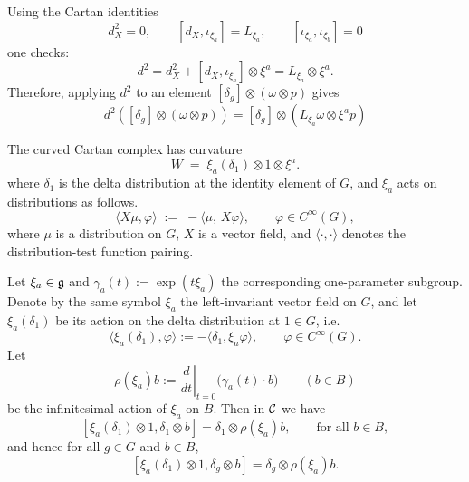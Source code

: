 \documentclass[12pt]{article}
\begin{document}
Using the Cartan identities
\[d_X^2 = 0,\qquad
[d_X,\iota_{\xi_a}] = L_{\xi_a},\qquad
[\iota_{\xi_a},\iota_{\xi_b}] = 0\]
one checks:
\[
d^2
= d_X^2 + [d_X,\iota_{\xi_a}]\otimes\xi^a
= L_{\xi_a}\otimes \xi^a.
\]
Therefore, applying $d^2$ to an element $[\delta_g] \otimes (\omega \otimes p)$ gives
\begin{equation}
    d^2([\delta_g] \otimes (\omega \otimes p))
= [\delta_g] \otimes (L_{\xi_a}\omega \otimes \xi^a p)
\label{eq:d2-on-B}
\end{equation}



\begin{proposition}
    The curved Cartan complex has curvature
\[
W \;=\; \xi_a(\delta_1)\otimes 1 \otimes \xi^a.
\]
where $\delta_1$ is the delta distribution at the identity element of $G$, and $\xi_a$ acts on distributions as follows.
\[
\big\langle X\mu,\varphi\big\rangle \;:=\; -\big\langle \mu,\, X\varphi\big\rangle,
\qquad \varphi\in C^\infty(G),
\]
where $\mu$ is a distribution on $G$, $X$ is a vector field, and $\langle\cdot,\cdot\rangle$ denotes the distribution-test function pairing.
\end{proposition}



\begin{lemma}
Let $\xi_a\in\frak g$ and $\gamma_a(t):=\exp(t\xi_a)$ the corresponding
one-parameter subgroup.  Denote by the same symbol $\xi_a$ the
left-invariant vector field on $G$, and let $\xi_a(\delta_1)$ be its
action on the delta distribution at $1\in G$, i.e.
\[
\langle \xi_a(\delta_1),\varphi\rangle
:= -\langle \delta_1, \xi_a\varphi\rangle,
\qquad \varphi\in C^\infty(G).
\]
Let
\[
\rho(\xi_a)b := \left.\frac{d}{dt}\right|_{t=0} \bigl(\gamma_a(t)\cdot b\bigr)
\qquad (b\in B)
\]
be the infinitesimal action of $\xi_a$ on $B$.  Then in ${\mathcal{C}}$ we have
\begin{equation}\label{eq:xi-delta1-comm}
[\xi_a(\delta_1) \otimes 1, \delta_1 \otimes b] = \delta_1 \otimes \rho(\xi_a)b,
\qquad\text{for all }b\in B,
\end{equation}
and hence for all $g\in G$ and $b\in B$,
\begin{equation}\label{eq:xi-delta1-comm-g}
[\xi_a(\delta_1) \otimes 1, \delta_g \otimes b] = \delta_g \otimes \rho(\xi_a)b.
\end{equation}
\end{lemma}
\end{document}

